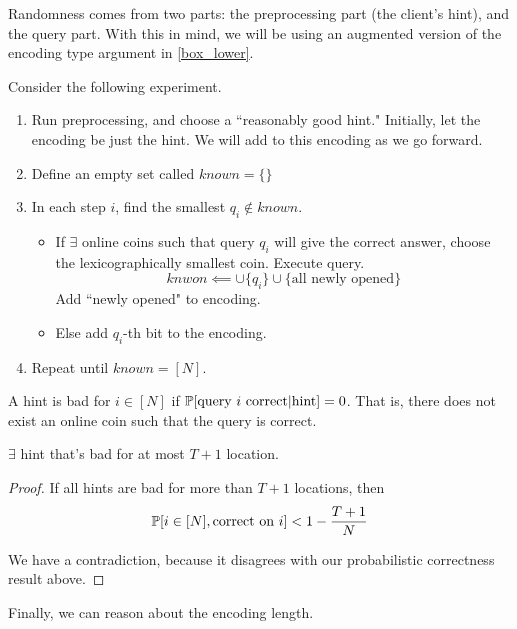 Randomness comes from two parts: the preprocessing part (the client's hint), and the query part. With this in mind, we will be using an augmented version of the encoding type argument in \ref{box_lower}.

Consider the following experiment.
\begin{enumerate}
    \item Run preprocessing, and choose a ``reasonably good hint." Initially, let the encoding be just the hint. We will add to this encoding as we go forward.
    \item Define an empty set called $known = \{\}$
    \item In each step $i$, find the smallest $q_i \notin known$. 
    \begin{itemize}
        \item If $\exists$ online coins such that query $q_i$ will give the correct answer, choose the lexicographically smallest coin. Execute query.
        \[knwon \impliedby \cup \{q_i\} \cup \{\text{all newly opened}\}\]
        Add ``newly opened" to encoding.
        \item Else add $q_i$-th bit to the encoding.
    \end{itemize}
    \item Repeat until $known = [N]$.
    
\end{enumerate}

A hint is bad for $i \in [N]$ if $\mathbb{P}[\text{query $i$ correct} | \text{hint}] = 0$. That is, there does not exist an online coin such that the query is correct.

\begin{claim}
    $\exists$ hint that's bad for at most $T + 1$ location.
\end{claim}
\begin{proof}
    If all hints are bad for  more than $T+1$ locations, then
    \[\mathbb{P}[i \in [N], \text{correct on $i$}] < 1 - \frac{T+1}{N}\]

    We have a contradiction, because it disagrees with our probabilistic correctness result above.
\end{proof}

Finally, we can reason about the encoding length. 

